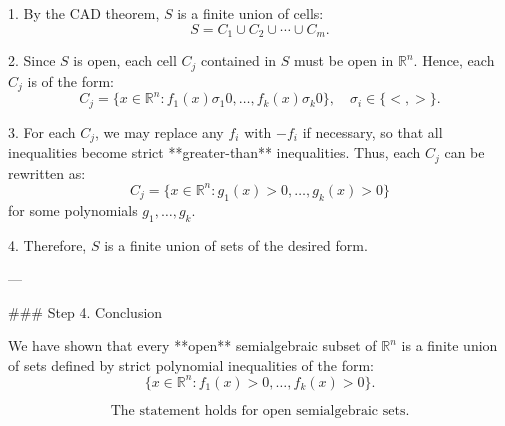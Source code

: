 \documentclass[12pt]{article}
\theoremstyle{mythm}
\let\oldendproof\endproof
\renewenvironment{proof}[1][\proofname]{%
  \oldproof[\normalfont \bfseries \sffamily #1]%
}{\oldendproof}
\renewcommand*{\proofname}{Proof}
\renewcommand*{\proofname}{Proof}
\renewcommand*{\proofname}{Proof}
\renewcommand*{\proofname}{Proof}
\renewcommand*{\proofname}{Proof}
\renewcommand*{\proofname}{Proof}
\renewcommand*{\proofname}{Proof}
\begin{document}
\begin{proof}
1. By the CAD theorem, \(S\) is a finite union of cells:
   \[
   S = C_1 \cup C_2 \cup \cdots \cup C_m.
   \]

2. Since \(S\) is open, each cell \(C_j\) contained in \(S\) must be open in \(\mathbb{R}^n\). Hence, each \(C_j\) is of the form:
   \[
   C_j = \{x \in \mathbb{R}^n : f_1(x) \sigma_1 0, \ldots, f_k(x) \sigma_k 0\}, \quad \sigma_i \in \{<, >\}.
   \]

3. For each \(C_j\), we may replace any \(f_i\) with \(-f_i\) if necessary, so that all inequalities become strict **greater-than** inequalities. Thus, each \(C_j\) can be rewritten as:
   \[
   C_j = \{x \in \mathbb{R}^n : g_1(x) > 0, \ldots, g_k(x) > 0\}
   \]
   for some polynomials \(g_1, \ldots, g_k\).

4. Therefore, \(S\) is a finite union of sets of the desired form.

---

### Step 4. Conclusion

We have shown that every **open** semialgebraic subset of \(\mathbb{R}^n\) is a finite union of sets defined by strict polynomial inequalities of the form:
\[
\{x \in \mathbb{R}^n : f_1(x) > 0, \ldots, f_k(x) > 0\}.
\]

\[
\boxed{\text{The statement holds for open semialgebraic sets.}}
\]
\end{proof}
\end{document}
